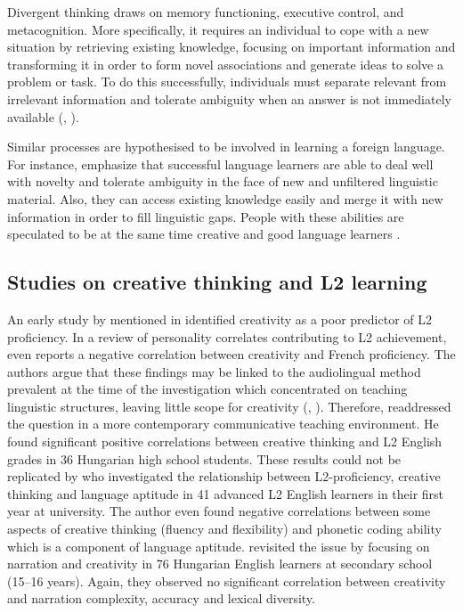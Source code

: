 \documentclass[output=paper]{langsci/langscibook}
\begin{document}
Divergent thinking draws on memory functioning, executive control, and metacognition. More specifically, it requires an individual to cope with a new situation by retrieving existing knowledge, focusing on important information and transforming it in order to form novel associations and generate ideas to solve a problem or task. To do this successfully, individuals must separate relevant from irrelevant information and tolerate ambiguity when an answer is not immediately available (\citealt{FinkeEtAl1992}, \citealt{Cropley2006}).

Similar processes are hypothesised to be involved in learning a foreign language. For instance, \citet{GrigorenkoEtAl2000} emphasize that successful language learners are able to deal well with novelty and tolerate ambiguity in the face of new and unfiltered linguistic material. Also, they can access existing knowledge easily and merge it with new information in order to fill linguistic gaps. People with these abilities are speculated to be at the same time creative and good language learners \citep{Kharkhurin2012}.

\subsection{Studies on creative thinking and L2 learning}\label{sec:06:2.2}

An early study by \citet{Carroll1964} mentioned in \citet{Otto1998} identified creativity as a poor predictor of L2 proficiency. In a review of personality correlates contributing to L2 achievement, \citet{Gardner1990} even reports a negative correlation between creativity and French proficiency. The authors argue that these findings may be linked to the audiolingual method prevalent at the time of the investigation which concentrated on teaching linguistic structures, leaving little scope for creativity (\citealt{Otto1998}, \citealt{Gardner1990}). Therefore, \citet{Otto1998} readdressed the question in a more contemporary communicative teaching environment. He found significant positive correlations between creative thinking and L2 English grades in 36 Hungarian high school students. These results could not be replicated by \citet{Albert2006} who investigated the relationship between L2-proficiency, creative thinking and language aptitude in 41 advanced L2 English learners in their first year at university. The author even found negative correlations between some aspects of creative thinking (fluency and flexibility) and phonetic coding ability which is a component of language aptitude. \citet{AlbertKormos2011} revisited the issue by focusing on narration and creativity in 76 Hungarian English learners at secondary school (15--16 years). Again, they observed no significant correlation between creativity and narration complexity, accuracy and lexical diversity.
\end{document}
